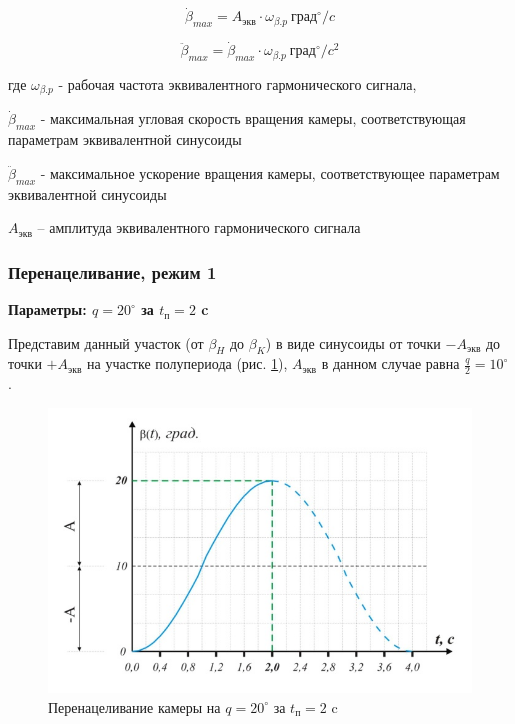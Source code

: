 \begin{equation}
    \label{max_speed_for_equiv_signal}
    \dot{\beta}_{max} = A_\text{экв} \cdot \omega_{\beta.p} ~\text{град}^{\circ} / c
\end{equation}

\begin{equation}
    \label{max_acceleration_for_equiv_signal}
    \ddot{\beta}_{max} = \dot{\beta}_{max} \cdot \omega_{\beta.p} ~\text{град}^{\circ} / c^{2}
\end{equation}

где $\omega_{\beta.p}$ - рабочая частота эквивалентного гармонического сигнала,

$\dot{\beta}_{max}$ - максимальная угловая скорость вращения камеры,
соответствующая параметрам эквивалентной синусоиды

$\ddot{\beta}_{max}$ - максимальное ускорение вращения камеры,
соответствующее параметрам эквивалентной синусоиды

$A_\text{экв}$ – амплитуда эквивалентного гармонического сигнала

\subsubsection{Перенацеливание, режим 1}

\textbf{Параметры: $q = 20^{\circ}$ за $t_{\text{п}} = 2$ c}

Представим данный участок (от $\beta_{H}$ до $\beta_{K}$) в виде синусоиды
от точки $-A_\text{экв}$ до точки $+A_\text{экв}$ на участке полупериода
(рис. \ref{retarget_20grad_2sec}), $A_\text{экв}$ в данном случае
равна $\frac{q}{2} = 10^{\circ}$.

\begin{figure}[ht!]
    \centering
    \includegraphics[keepaspectratio]{./src/pictures/retarget_equivalent_input_signals/20grad_2sec}
    \caption{Перенацеливание камеры на $q = 20^{\circ}$ за $t_\text{п} = 2$ c}
    \label{retarget_20grad_2sec}
\end{figure}

